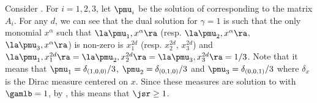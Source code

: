 \begin{myexem}
  \label{exem:simple2}
  Consider .
  For $i = 1, 2, 3$, let $\pmu_i$ be the solution of  corresponding to the matrix $A_i$.
  For any $d$, we can see that the dual solution for $\gamma = 1$ is such that
  the only monomial $x^\alpha$ such that $\la\pmu_1, x^\alpha \ra$ (resp. $\la \pmu_2, x^\alpha \ra$, $\la \pmu_3, x^\alpha \ra$) is non-zero is $x_1^{2d}$ (resp. $x_2^{2d}$, $x_3^{2d}$)
  and $\la \pmu_1, x_1^{2d} \ra = \la \pmu_2, x_2^{2d} \ra = \la \pmu_3, x_3^{2d} \ra = 1/3$.
  Note that it means that $\pmu_1 = \delta_{(1,0,0)}/3$, $\pmu_2 = \delta_{(0,1,0)}/3$ and $\pmu_3 = \delta_{(0,0,1)}/3$
  where $\delta_x$ is the Dirac measure centered on $x$.
  Since these measures are solution to  with $\gamlb = 1$,
  by , this means that $\jsr \geq 1$.
\end{myexem}

